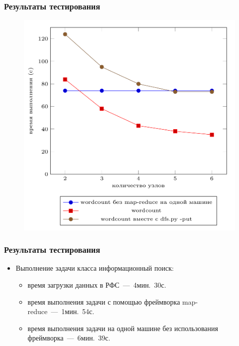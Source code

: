 \documentclass[utf8]{beamer}
\begin{document}
    \begin{frame}
    \frametitle{Результаты тестирования}
        \begin{figure}[h!]
            \centering
            \includegraphics[scale=0.23]{test2.png}
        \end{figure}        
    \end{frame}

    \begin{frame}
    \frametitle{Результаты тестирования}
        \begin{itemize}
            \item Выполнение задачи класса информационный поиск:
            \begin{itemize}
                \item время загрузки данных в РФС~---~4мин.~30с.
                \item время выполнения задачи с помощью фреймворка map-reduce~---~1мин.~54с.
                \item время выполнения задачи на одной машине без использования фреймворка~---~6мин.~39с.
            \end{itemize}
        \end{itemize}
    \end{frame}
\end{document}
